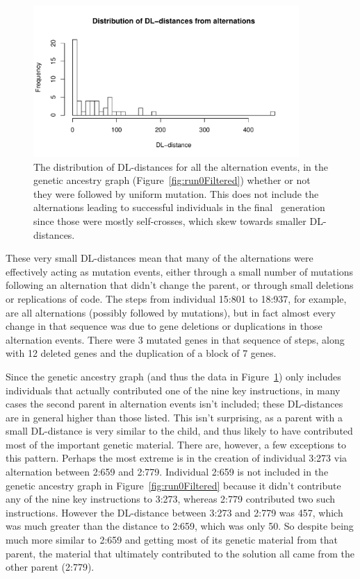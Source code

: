 \begin{figure}[t]
	\begin{center}
		\includegraphics[width=0.9\textwidth]{../figures/Alternation_dl_distance_distribution}
	\end{center}
	\vspace{-0.5 cm}
	\caption{The distribution of DL-distances for all the alternation events, 
		in the genetic ancestry graph (Figure~\ref{fig:run0Filtered}) whether 
		or not they were followed by uniform mutation. This does not include
		the alternations leading to successful individuals in the final \
		generation since those were mostly self-crosses, which skew towards 
		smaller DL-distances.}
	\label{fig:alt:DLdist:distribution}
\end{figure}

These very small DL-distances mean that many of the alternations were 
effectively acting as mutation events, either through a small number of
mutations following an alternation that didn't change the parent, or 
through small deletions or replications of code. The steps from individual
15:801 to 18:937, for example, are all alternations (possibly followed
by mutations), but in fact almost every change in that sequence was due to
gene deletions or duplications in those alternation events. There were 3
mutated genes in that sequence of steps, along with 12 deleted genes and the
duplication of a block of 7 genes.

Since the genetic ancestry graph (and thus the data in 
Figure~\ref{fig:alt:DLdist:distribution}) only includes individuals that 
actually
contributed one of the nine key instructions, in many cases the second parent
in alternation events isn't included; these DL-distances are in general
higher than those listed. This isn't surprising, as a parent with a small
DL-distance is very similar to the child, and thus likely to have contributed
most of the important genetic material. There are, however, a few exceptions 
to this pattern. Perhaps the most extreme is in the creation of individual
3:273 via alternation between 2:659 and 2:779. Individual 2:659 is not included
in the genetic ancestry graph in Figure~\ref{fig:run0Filtered} because it didn't
contribute any of the nine key instructions to 3:273, whereas 2:779 contributed
two such instructions. However the DL-distance between 3:273 and 2:779 was 457, 
which was much greater than the distance to 2:659, which was only 50. So despite
being much more similar to 2:659 and getting most of its genetic material from
that parent, the material that ultimately contributed to the solution all came
from the other parent (2:779).

